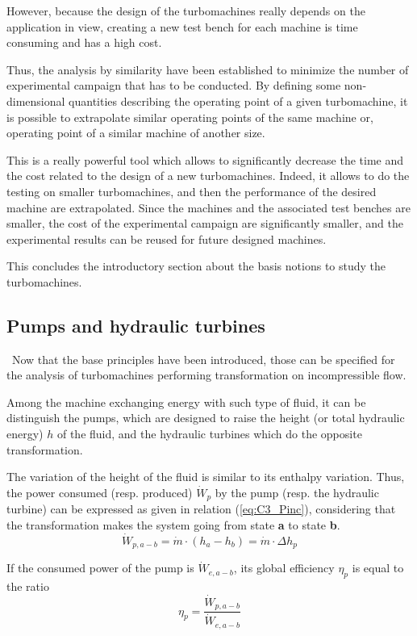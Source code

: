However, because the design of the turbomachines really depends on the application in view, creating a new test bench for each machine is time consuming and has a high cost. 

Thus, the analysis by similarity have been established to 
minimize the number of experimental campaign that has to be conducted. By defining some non-dimensional quantities describing the operating point of a given turbomachine, it is possible to extrapolate similar operating points of the same machine or, operating point of a similar machine of another size. 

This is a really powerful tool which allows to significantly decrease the time and the cost related to the design of a new turbomachines. Indeed, it allows to do the testing on smaller turbomachines, and then the performance of the desired machine are extrapolated. Since the machines and the associated test benches are smaller, the cost of the experimental campaign are significantly smaller, and the experimental results can be reused for future designed machines.

This concludes the introductory section about the basis notions to study the turbomachines. 
\newpage
\subsection{Pumps and hydraulic turbines}
\quad\, Now that the base principles have been introduced, those can be specified for the analysis of turbomachines performing transformation on incompressible flow. 

Among the machine exchanging energy with such type of fluid, it can be distinguish the pumps, which are designed to raise the height (or total hydraulic energy) \(h\) of the fluid, and the hydraulic turbines which do the opposite transformation. 

The variation of the height of the fluid is similar to its enthalpy variation. Thus, the power consumed (resp. produced) \(\dot{W}_p\) by the pump (resp. the hydraulic turbine) can be expressed as given in relation (\ref{eq:C3_Pinc}), considering that the transformation makes the system going from state \textbf{a} to state \textbf{b}.
\begin{equation}
    \dot{W}_{p,a-b} = \dot{m}\cdot (h_a - h_b)=\dot{m}\cdot\Delta h_p \label{eq:C3_Pinc}
\end{equation}


If the consumed power of the pump is \(\dot{W}_{e,a-b}\), its global efficiency \(\eta_p\) is equal to the ratio
\begin{equation}
    \eta_p = \frac{\dot{W}_{p,a-b}}{\dot{W}_{e,a-b}}\label{eq:C3_Etapump}
\end{equation}
